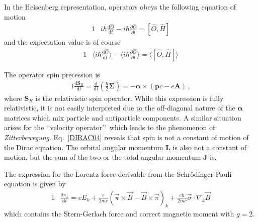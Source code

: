 In the Heisenberg representation, operators obeys the following equation of motion
\begin{alignat}{1}
  \label{m06}		&i\hbar\frac{\mathrm{d}\hat{O}}{\mathrm{d}t}-i\hbar\frac{\partial\hat{O}}{\partial t}=[\hat{O},\hat{H}]
\end{alignat}
and the expectation value is of course
\begin{alignat}{1}
  \label{m07}		&\langle i\hbar\frac{\mathrm{d}\hat{O}}{\mathrm{d}t}\rangle-\langle i\hbar\frac{\partial\hat{O}}{\partial t}\rangle=\langle[\hat{O},\hat{H}]\rangle
\end{alignat}

The operator spin precession is
\begin{alignat}{1}
  \label{DIRAC04} \frac{\mathrm{d}\mathbf{S}_{R}}{\mathrm{d}t}=\frac{\mathrm{d}}{\mathrm{d}t}\left(\frac{\hbar}{2}\boldsymbol{\Sigma}\right)=-\boldsymbol{\alpha}\times\left(\mathbf{p}c-e\mathbf{A}\right)\,,
\end{alignat}
where $\mathbf{S}_{R}$ is the relativistic spin operator. While this expression is fully relativistic, it is not easily interpreted due to the off-diagonal nature of the $\boldsymbol{\alpha}$ matrices which mix particle and antiparticle components. A similar situation arises for the \lq\lq velocity operator\rq\rq\, which leads to the phenomenon of \emph{Zitterbewegung}. Eq.~\eqref{DIRAC04} reveals that spin is not a constant of motion of the Dirac equation. The orbital angular momentum $\mathbf{L}$ is also not a constant of motion, but the sum of the two or the total angular momentum $\mathbf{J}$ is.

The expression for the Lorentz force derivable from the Schr{\"o}dinger-Pauli equation is given by
\begin{alignat}{1}
  \label{m31}		&\frac{\mathrm{d}\pi_{k}}{\mathrm{d}t}=eE_{k}+\frac{e}{2mc}(\vec{\pi}\times\vec{B}-\vec{B}\times\vec{\pi})_{k}+\frac{e\hbar}{2mc}\vec{\sigma}\cdot\nabla_{k}\vec{B}
\end{alignat}
which contains the Stern-Gerlach force and correct magnetic moment with $g=2$.

